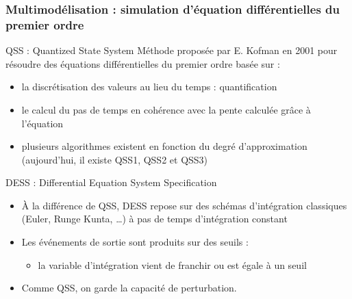 \documentclass[xetex, compress, table, svgnames]{beamer}
\begin{document}
\begin{frame}
  \frametitle{Multimodélisation : simulation d'équation
    différentielles du premier ordre}
  \begin{block}{QSS : Quantized State System}
    Méthode proposée par E. Kofman en 2001 pour résoudre des équations
    différentielles du premier ordre basée sur :
    \begin{itemize}
    \item la discrétisation des valeurs au lieu du temps : quantification
    \item le calcul du pas de temps en cohérence avec la pente calculée
      grâce à l'équation
    \item plusieurs algorithmes existent en fonction du degré
      d'approximation (aujourd'hui, il existe QSS1, QSS2 et QSS3)
    \end{itemize}
  \end{block}
  \begin{block}{DESS : Differential Equation System Specification}
    \begin{itemize}
    \item À la différence de QSS, DESS repose sur des schémas
      d'intégration classiques (Euler, Runge Kunta, \ldots) à pas de temps
      d'intégration constant
    \item Les événements de sortie sont produits sur des seuils :
      \begin{itemize}
      \item la variable d'intégration vient de franchir ou est égale à un seuil
      \end{itemize}
    \item Comme QSS, on garde la capacité de perturbation.
    \end{itemize}
  \end{block}
\end{frame}
\end{document}
